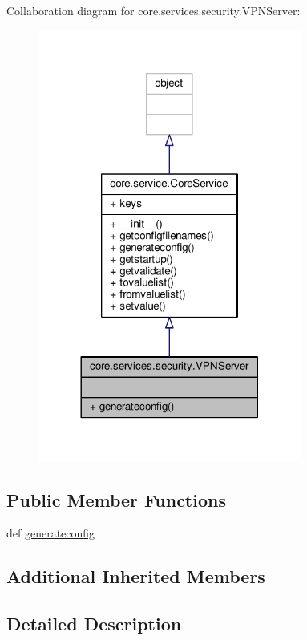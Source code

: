 Collaboration diagram for core.\+services.\+security.\+V\+P\+N\+Server\+:
\nopagebreak
\begin{figure}[H]
\begin{center}
\leavevmode
\includegraphics[width=245pt]{classcore_1_1services_1_1security_1_1_v_p_n_server__coll__graph}
\end{center}
\end{figure}
\subsection*{Public Member Functions}
\begin{DoxyCompactItemize}
\item 
def \hyperlink{classcore_1_1services_1_1security_1_1_v_p_n_server_ab04663e360b562e7b4266e8ea5d7af62}{generateconfig}
\end{DoxyCompactItemize}
\subsection*{Additional Inherited Members}


\subsection{Detailed Description}
\begin{DoxyVerb}\end{DoxyVerb}
 

